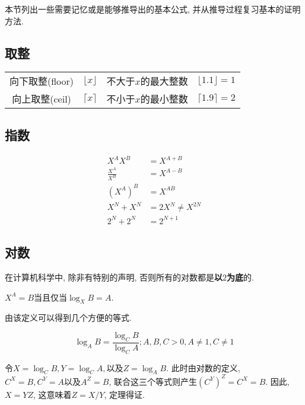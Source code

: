 \documentclass[oneside]{ctexbook}
\begin{document}
本节列出一些需要记忆或是能够推导出的基本公式, 并从推导过程复习基本的证明方法.

\subsection{取整}

\begin{tabular}{cccc}
    向下取整(floor) & $\lfloor x \rfloor$ & 不大于$x$的最大整数 & $\lfloor 1.1 \rfloor = 1$ \\
    向上取整(ceil)  & $\lceil x \rceil$   & 不小于$x$的最小整数 & $\lceil 1.9 \rceil = 2$
\end{tabular}

\subsection{指数}

\begin{equation*}
    \begin{split}
        X^AX^B &= X^{A+B} \\
        \frac{X^A}{X^B} &= X^{A-B} \\
        (X^A)^B &= X^{AB} \\
        X^N+X^N &= 2X^N \ne X^{2N} \\
        2^N+2^N &= 2^{N+1}
    \end{split}
\end{equation*}

\subsection{对数}

在计算机科学中, 除非有特别的声明, 否则所有的对数都是\textbf{以$2$为底}的.

\begin{mydefinition}{}{}
    $X^A=B\text{当且仅当}\log_XB=A$.
\end{mydefinition}

由该定义可以得到几个方便的等式.

\begin{mytheorem}{}{}
\begin{equation*}
    \log_AB = \frac{\log_CB}{\log_CA}; A,B,C > 0, A\ne 1, C\ne 1
\end{equation*}
\end{mytheorem}

\begin{myproof}{}{}
    令$X=\log_C{B},Y=\log_C{A},\text{以及}Z=\log_AB$. 此时由对数的定义, $C^X=B,C^Y=A\text{以及}A^Z=B$, 联合这三个等式则产生$(C^Y)^Z=C^X=B$. 因此, $X=YZ$, 这意味着$Z=X/Y$, 定理得证.
\end{myproof}
\end{document}
